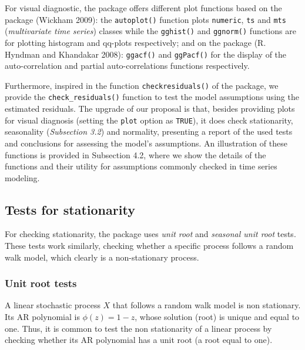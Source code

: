 For visual diagnostic, the package offers different plot functions based on the  package (Wickham 2009): the \texttt{autoplot()} function plots \texttt{numeric}, \texttt{ts} and \texttt{mts} (\emph{multivariate time series}) classes while the \texttt{gghist()} and \texttt{ggnorm()} functions are for plotting histogram and qq-plots respectively; and on the  package (R. Hyndman and Khandakar 2008): \texttt{ggacf()} and \texttt{ggPacf()} for the display of the auto-correlation and partial auto-correlations functions respectively.

Furthermore, inspired in the function \texttt{checkresiduals()} of the  package, we provide the \texttt{check\_residuals()} function to test the model assumptions using the estimated residuals. The upgrade of our proposal is that, besides providing plots for visual diagnosis (setting the \texttt{plot} option as \texttt{TRUE}), it does check stationarity, seasonality (\emph{Subsection 3.2}) and normality, presenting a report of the used tests and conclusions for assessing the model's assumptions. An illustration of these functions is provided in Subsection 4.2, where we show the details of the functions and their utility for assumptions commonly checked in time series modeling.

\hypertarget{tests-for-stationarity}{%
\subsection{Tests for stationarity}\label{tests-for-stationarity}}

For checking stationarity, the  package uses \textit{unit root} and \textit{seasonal unit root} tests. These tests work similarly, checking whether a specific process follows a random walk model, which clearly is a non-stationary process.

\hypertarget{unit-root-tests}{%
\subsubsection{Unit root tests}\label{unit-root-tests}}

A linear stochastic process \(X\) that follows a random walk model is non stationary. Its AR polynomial is \(\phi(z) = 1 - z\), whose solution (root) is unique and equal to one. Thus, it is common to test the non stationarity of a linear process by checking whether its AR polynomial has a unit root (a root equal to one).


